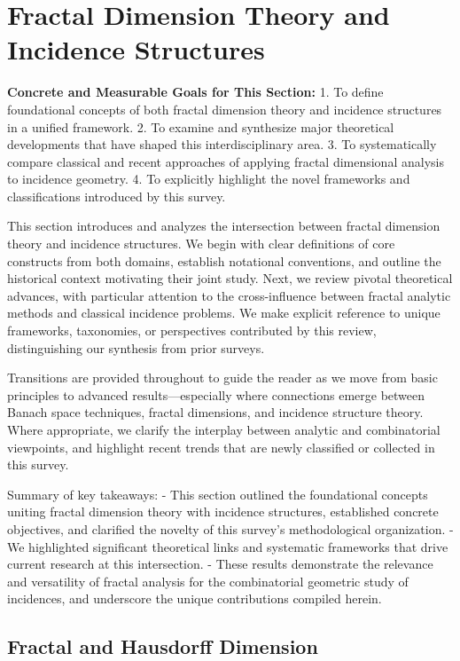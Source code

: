 \documentclass[sigconf]{acmart}
\begin{document}
\section{Fractal Dimension Theory and Incidence Structures}

\textbf{Concrete and Measurable Goals for This Section:}
1. To define foundational concepts of both fractal dimension theory and incidence structures in a unified framework.
2. To examine and synthesize major theoretical developments that have shaped this interdisciplinary area.
3. To systematically compare classical and recent approaches of applying fractal dimensional analysis to incidence geometry.
4. To explicitly highlight the novel frameworks and classifications introduced by this survey.

This section introduces and analyzes the intersection between fractal dimension theory and incidence structures. We begin with clear definitions of core constructs from both domains, establish notational conventions, and outline the historical context motivating their joint study. Next, we review pivotal theoretical advances, with particular attention to the cross-influence between fractal analytic methods and classical incidence problems. We make explicit reference to unique frameworks, taxonomies, or perspectives contributed by this review, distinguishing our synthesis from prior surveys.

Transitions are provided throughout to guide the reader as we move from basic principles to advanced results—especially where connections emerge between Banach space techniques, fractal dimensions, and incidence structure theory. Where appropriate, we clarify the interplay between analytic and combinatorial viewpoints, and highlight recent trends that are newly classified or collected in this survey.

Summary of key takeaways:
- This section outlined the foundational concepts uniting fractal dimension theory with incidence structures, established concrete objectives, and clarified the novelty of this survey's methodological organization.
- We highlighted significant theoretical links and systematic frameworks that drive current research at this intersection.
- These results demonstrate the relevance and versatility of fractal analysis for the combinatorial geometric study of incidences, and underscore the unique contributions compiled herein.

\subsection{Fractal and Hausdorff Dimension}
\end{document}
